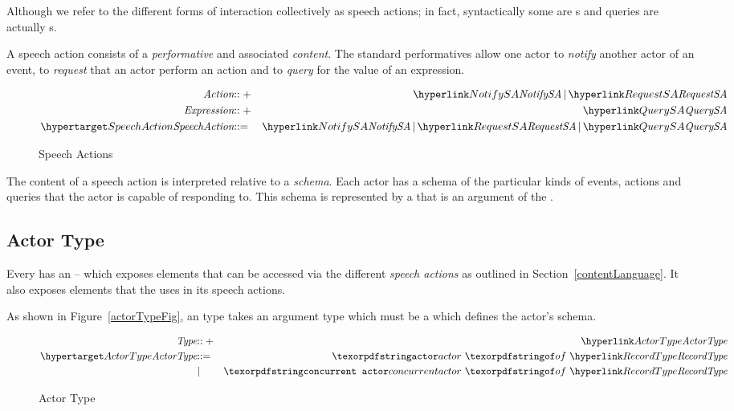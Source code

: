 \begin{aside}
Although we refer to the different forms of interaction collectively as speech actions; in fact, syntactically some are s and queries are actually s.
\end{aside}

A speech action consists of a \emph{performative} and associated \emph{content}. The standard performatives allow one actor to \emph{notify} another actor of an event, to \emph{request} that an actor perform an action and to \emph{query} for the value of an expression.

\begin{figure}[htbp]
\begin{eqnarray*}
\emph{Action}&\arrowplus&\ntRef{NotifySA}\,\choice\,\ntRef{RequestSA}\\
\emph{Expression}&\arrowplus&\ntRef{QuerySA}\\
\ntDef{SpeechAction}&\arrow&\ntRef{NotifySA}\,\choice\,\ntRef{RequestSA}\,\choice\,\ntRef{QuerySA}
\end{eqnarray*}
\caption{Speech Actions}
\label{speechActionFig}
\end{figure}

The content of a speech action is interpreted relative to a \emph{schema}. Each actor has a schema of the particular kinds of events, actions and queries that the actor is capable of responding to. This schema is represented by a  that is an argument of the .

\subsection{Actor Type}
\label{actorType}
Every  has an  -- which exposes elements that can be accessed via the different \emph{speech actions} as outlined in Section~\vref{contentLanguage}. It also exposes elements that the  uses in its speech actions.

As shown in Figure~\vref{actorTypeFig}, an  type takes an argument type which must be a  which defines the actor's schema. 

\begin{figure}[htbp]
\begin{eqnarray*}
\emph{Type}&\arrowplus&\ntRef{ActorType}\\
\ntDef{ActorType}&\arrow&\q{actor}\ \q{of}\ \ntRef{RecordType}\\
&\choice&\q{concurrent actor}\ \q{of}\ \ntRef{RecordType}
\end{eqnarray*}
\caption{Actor Type}
\label{actorTypeFig}
\end{figure}

